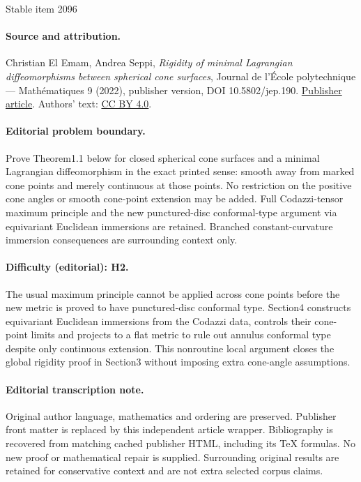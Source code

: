\documentclass[11pt]{article}
\theoremstyle{definition}
\begin{document}
\begin{center}{\Large Stable item 2096}\end{center}
\paragraph{Source and attribution.}
Christian El Emam, Andrea Seppi, \emph{Rigidity of minimal Lagrangian diffeomorphisms between spherical cone surfaces}, Journal de l’École polytechnique — Mathématiques 9 (2022), publisher version, DOI 10.5802/jep.190. \href{https://jep.centre-mersenne.org/articles/10.5802/jep.190/}{Publisher article}. Authors' text: \href{https://creativecommons.org/licenses/by/4.0/}{CC BY 4.0}.
\paragraph{Editorial problem boundary.}
Prove Theorem1.1 below for closed spherical cone surfaces and a minimal Lagrangian diffeomorphism in the exact printed sense: smooth away from marked cone points and merely continuous at those points. No restriction on the positive cone angles or smooth cone-point extension may be added. Full Codazzi-tensor maximum principle and the new punctured-disc conformal-type argument via equivariant Euclidean immersions are retained. Branched constant-curvature immersion consequences are surrounding context only.
\paragraph{Difficulty (editorial): H2.}
The usual maximum principle cannot be applied across cone points before the new metric is proved to have punctured-disc conformal type. Section4 constructs equivariant Euclidean immersions from the Codazzi data, controls their cone-point limits and projects to a flat metric to rule out annulus conformal type despite only continuous extension. This nonroutine local argument closes the global rigidity proof in Section3 without imposing extra cone-angle assumptions.
\paragraph{Editorial transcription note.}
Original author language, mathematics and ordering are preserved. Publisher front matter is replaced by this independent article wrapper. Bibliography is recovered from matching cached publisher HTML, including its TeX formulas. No new proof or mathematical repair is supplied. Surrounding original results are retained for conservative context and are not extra selected corpus claims.
\clearpage
\end{document}
